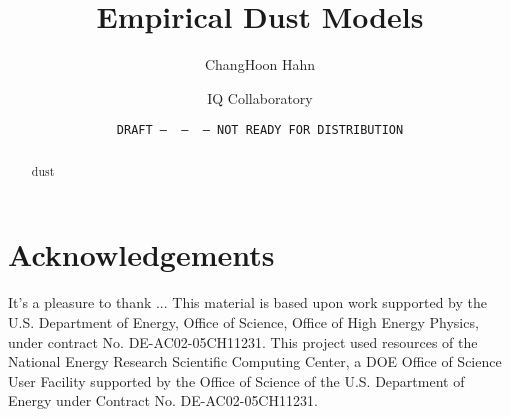 \documentclass[12pt, letterpaper, preprint]{aastex62}
\begin{document}
\sloppy\sloppypar\frenchspacing 

\title{Empirical Dust Models} 
\date{\texttt{DRAFT~---~\githash~---~\gitdate~---~NOT READY FOR DISTRIBUTION}}

\author{ChangHoon Hahn}

\author{IQ Collaboratory}

\begin{abstract}
    dust 
\end{abstract}



 




\section*{Acknowledgements}
It's a pleasure to thank
    ...
This material is based upon work supported by the U.S. Department of Energy,
Office of Science, Office of High Energy Physics, under contract No.
DE-AC02-05CH11231.  This project used resources of the National Energy Research
Scientific Computing Center, a DOE Office of Science User Facility supported by
the Office of Science of the U.S.  Department of Energy under Contract No.
DE-AC02-05CH11231. 

\appendix
 


 
\end{document}

